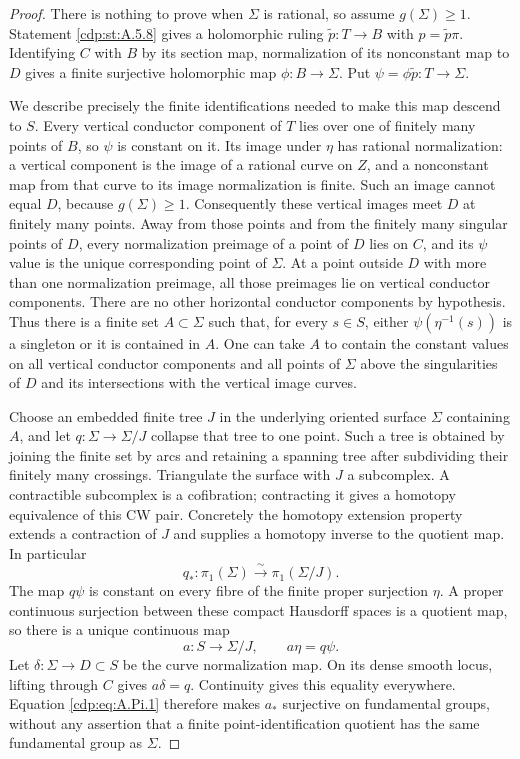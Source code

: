 \begin{proof}
There is nothing to prove when $\Sigma$ is rational, so
assume $g(\Sigma)\ge1$.
Statement \ref{cdp:st:A.5.8} gives a holomorphic ruling
$\widetilde p:T\to B$ with $p=\widetilde p\pi$.
Identifying $C$ with $B$ by its section map, normalization
of its nonconstant map to $D$ gives a finite surjective
holomorphic map $\phi:B\to\Sigma$.
Put $\psi=\phi\widetilde p:T\to\Sigma$.

We describe precisely the finite identifications needed to
make this map descend to $S$. Every vertical conductor
component of $T$ lies over one of finitely many points of
$B$, so $\psi$ is constant on it. Its image under $\eta$
has rational normalization: a vertical component is the
image of a rational curve on $Z$, and a nonconstant map
from that curve to its image normalization is finite.
Such an image cannot equal $D$, because $g(\Sigma)\ge1$.
Consequently these vertical images meet $D$ at finitely
many points. Away from those points and from the finitely
many singular points of $D$, every normalization preimage
of a point of $D$ lies on $C$, and its $\psi$ value is the
unique corresponding point of $\Sigma$.
At a point outside $D$ with more than one normalization
preimage, all those preimages lie on vertical conductor
components. There are no other horizontal conductor
components by hypothesis. Thus there is a finite set
$A\subset\Sigma$ such that, for every $s\in S$, either
$\psi(\eta^{-1}(s))$ is a singleton or it is contained
in $A$. One can take $A$ to contain the constant values
on all vertical conductor components and all points of
$\Sigma$ above the singularities of $D$ and its
intersections with the vertical image curves.

Choose an embedded finite tree $J$ in the underlying
oriented surface $\Sigma$ containing $A$, and let
$q:\Sigma\to\Sigma/J$ collapse that tree to one point.
Such a tree is obtained by joining the finite set by
arcs and retaining a spanning tree after subdividing
their finitely many crossings. Triangulate the surface
with $J$ a subcomplex. A contractible subcomplex is a
cofibration; contracting it gives a homotopy equivalence
of this CW pair. Concretely the homotopy extension
property extends a contraction of $J$ and supplies a
homotopy inverse to the quotient map. In particular
\[
              q_*:\pi_1(\Sigma)\xrightarrow{\sim}
                         \pi_1(\Sigma/J).          \tag{A.Pi.1}\label{cdp:eq:A.Pi.1}
\]
The map $q\psi$ is constant on every fibre of the finite
proper surjection $\eta$. A proper continuous surjection
between these compact Hausdorff spaces is a quotient
map, so there is a unique continuous map
\[
 a:S\longrightarrow\Sigma/J,
 \qquad a\eta=q\psi.                              \tag{A.Pi.2}\label{cdp:eq:A.Pi.2}
\]
Let $\delta:\Sigma\to D\subset S$ be the curve normalization
map. On its dense smooth locus, lifting through $C$ gives
$a\delta=q$. Continuity gives this equality everywhere.
Equation \eqref{cdp:eq:A.Pi.1} therefore makes $a_*$ surjective on
fundamental groups, without any assertion that a finite
point-identification quotient has the same fundamental
group as $\Sigma$.


\end{proof}
